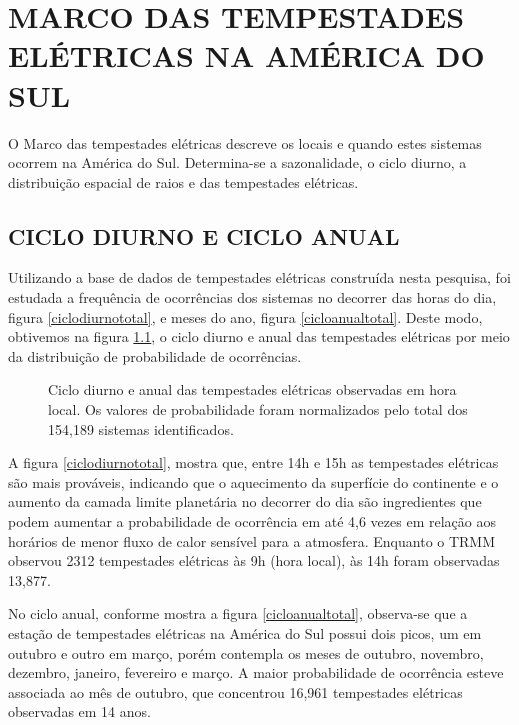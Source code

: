 \chapter{MARCO DAS TEMPESTADES ELÉTRICAS NA AMÉRICA DO SUL}


O Marco das tempestades elétricas descreve os locais e quando estes sistemas ocorrem na América do Sul. Determina-se a sazonalidade, o ciclo diurno, a distribuição espacial de raios e das tempestades elétricas. 

\section{CICLO DIURNO E CICLO ANUAL}

Utilizando a base de dados de tempestades elétricas construída nesta pesquisa, foi estudada a frequência de ocorrências dos sistemas no decorrer das horas do dia, figura \ref{ciclodiurnototal}, e meses do ano, figura \ref{cicloanualtotal}. Deste modo, obtivemos na figura \ref{diurnoanual}, o ciclo diurno e anual das tempestades elétricas por meio da distribuição de probabilidade de ocorrências.


\begin{figure}[!hb]
\caption{Ciclo diurno e anual das tempestades elétricas observadas em hora local. Os valores de probabilidade foram normalizados pelo total dos 154,189 sistemas identificados.}
\label{diurnoanual} 
\end{figure} 

A figura \ref{ciclodiurnototal},  mostra que, entre 14h e 15h as tempestades elétricas são mais prováveis, indicando que o aquecimento da superfície do continente e o aumento da camada limite planetária no decorrer do dia são ingredientes que podem aumentar a probabilidade de ocorrência em até 4,6 vezes em relação aos horários de menor fluxo de calor sensível para a atmosfera. Enquanto o TRMM observou 2312 tempestades elétricas às 9h (hora local), às 14h foram observadas 13,877.

No ciclo anual, conforme mostra a figura \ref{cicloanualtotal}, observa-se que a estação de tempestades elétricas na América do Sul possui dois picos, um em outubro e outro em março, porém contempla os meses de outubro, novembro, dezembro, janeiro, fevereiro e março. A maior probabilidade de ocorrência esteve associada ao mês de outubro, que concentrou 16,961 tempestades elétricas observadas em 14 anos. %


